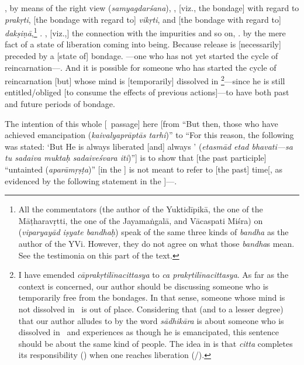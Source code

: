 , by means of the right view (\emph{samyagdarśana}), , [viz., the bondage] with regard to \emph{prakṛti}, [the bondage with regard to] \emph{vikṛti}, and [the bondage with regard to] \emph{dakṣiṇā},\footnote{All the commentators (the author of the Yuktidīpikā, the one of the Māṭharavṛtti, the one of the Jayamaṅgalā, and Vācaspati Miśra) on  (\emph{viparyayād iṣyate bandhaḥ}) speak of the same three kinds of \emph{bandha} as the author of the YVi.  However, they do not agree on what those \emph{bandha\/}s mean.  See the testimonia on this part of the text.} .  , [viz.,] the connection with the impurities and so on, .   by the mere fact of a state of liberation coming into being.  Because release is [necessarily] preceded by a [state of] bondage.  ---one who has not yet started the cycle of reincarnation---.  And it is possible for someone who has started the cycle of reincarnation [but] whose mind is [temporarily] dissolved in \prakrti\footnote{I have emended \emph{cāprakṛtilīnacittasya} to \emph{ca prakṛtilīnacittasya}. As far as the context is concerned, our author should be discussing someone who is temporarily free from the bondages. In that sense, someone whose mind is not dissolved in \prakrti\ is out of place. Considering that  (and  to a lesser degree) that our author alludes to by the word \emph{sādhikāra} is about someone who is dissolved in \prakrti\ and experiences as though he is emancipated, this sentence should be about the same kind of people. The idea in  is that \emph{citta} completes its responsibility (\adhikara) when one reaches liberation (\moksa/\kaivalya).}---since he is still entitled/obliged [to consume the effects of previous actions]---to have both past and future periods of bondage.

The %
intention of this whole [\bhasya\ passage] here [from ``But then, those who have achieved emancipation (\emph{kaivalyaprāptās tarhi})'' to ``For this reason, the following was stated: `But He is always liberated [and] always \Isvara' (\emph{etasmād etad bhavati---sa tu sadaiva muktaḥ sadaiveśvara iti})''] is to show that [the past participle] ``untainted (\emph{aparāmṛṣṭa})'' [in the \sutra] is not meant to refer to [the past] time[, as evidenced by the following statement in the \bhasya]---.

